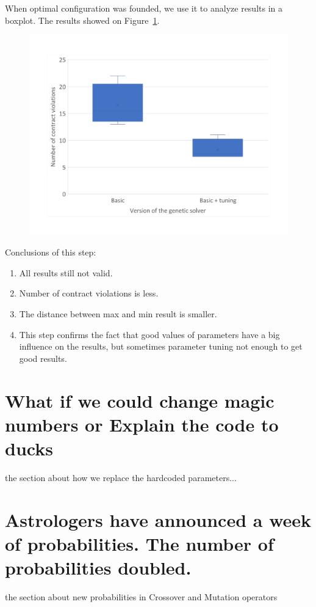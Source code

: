 When optimal configuration was founded, we use it to analyze results in a boxplot.
The results showed on Figure~\ref{fig:boxplotsolverbasictuning}.
\begin{figure}
	\centering
	\includegraphics[width=\textwidth]{images/BoxPlotSolverBasicTuning}
	\caption[Boxplot of number of contract violations for the basic version of genetic solver and with tuned parameters]{}
	\label{fig:boxplotsolverbasictuning}
\end{figure}

Conclusions of this step:
\begin{enumerate}
	\item All results still not valid.
	\item Number of contract violations is less.
	\item The distance between max and min result is smaller.
	\item This step confirms the fact that good values of parameters have a big influence on the results, but sometimes parameter tuning not enough to get good results.
\end{enumerate}

\section{What if we could change magic numbers or Explain the code to ducks}
the section about how we replace the hardcoded parameters...

\section{Astrologers have announced a week of probabilities. The number of probabilities doubled.}
the section about new probabilities in Crossover and Mutation operators

